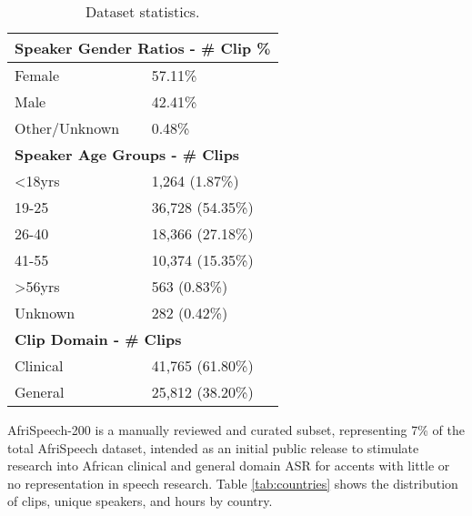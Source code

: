 \documentclass[11pt,a4paper]{article}
\begin{document}
\begin{table}
\small
\centering
\begin{tabular}{|l|l|}
\hline
\multicolumn{2}{|l|}{\textbf{Speaker Gender Ratios - \# Clip \%}}\\
\hline
Female & 57.11\%  \\
Male & 42.41\%  \\
Other/Unknown & 0.48\% \\
\hline
\multicolumn{2}{|l|}{\textbf{Speaker Age Groups - \# Clips}}\\
\hline
<18yrs & 1,264 (1.87\%) \\
19-25 & 36,728 (54.35\%)  \\
26-40 & 18,366 (27.18\%)  \\
41-55 & 10,374 (15.35\%) \\
>56yrs & 563 (0.83\%)  \\
Unknown & 282 (0.42\%) \\
\hline
\multicolumn{2}{|l|}{\textbf{Clip  Domain - \# Clips}}\\
\hline
Clinical & 41,765 (61.80\%)  \\
General & 25,812 (38.20\%) \\
\hline
\end{tabular}
\caption{Dataset statistics.}
\label{tab:dataset_stats}
\end{table}


AfriSpeech-200 is a manually reviewed and curated subset, representing 7\% of the total AfriSpeech dataset, intended as an initial public release to stimulate research into African clinical and general domain ASR for accents with little or no representation in speech research. Table \ref{tab:countries} shows the distribution of clips, unique speakers, and hours by country. 
\end{document}
